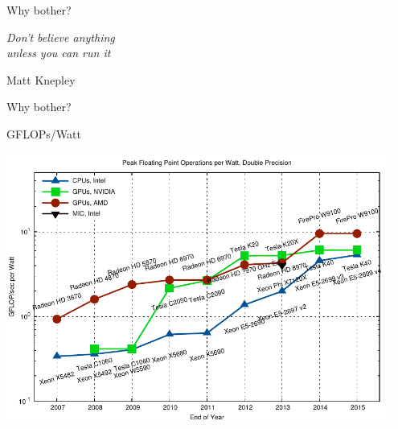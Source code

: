 

% 


\begin{frame}{Why bother?}
  \begin{center}
   \LARGE \hspace*{-1cm} \emph{Don't believe anything \\ \hspace*{1cm}unless you can run it}
  \end{center}
  \hspace*{6cm}Matt Knepley
\end{frame}



\begin{frame}{Why bother?}
  \begin{block}{GFLOPs/Watt}
  \begin{center} \vspace*{-0.5cm}
   \includegraphics[width=0.95\textwidth]{figures/gflops-per-watt-dp.pdf}
  \end{center}
  \end{block}
\end{frame}



